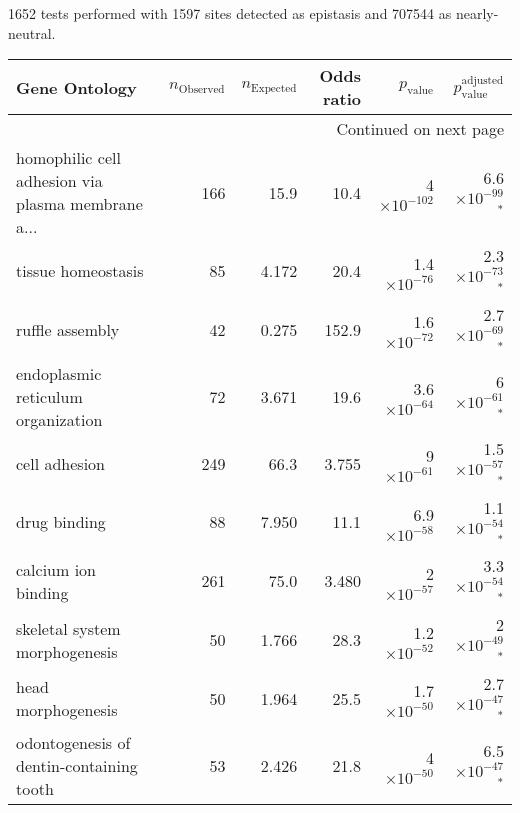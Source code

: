1652 tests performed with 1597 sites detected as epistasis and 707544 as nearly-neutral.
\scriptsize
\begin{longtable}{|l|r|r|r|r|r|}
\toprule
                                     Gene Ontology & $n_{\mathrm{Observed}}$ & $n_{\mathrm{Expected}}$ & Odds ratio &     $p_{\mathrm{value}}$ &      $p_{\mathrm{value}}^{\mathrm{adjusted}}$ \\
\midrule
\endhead
\midrule
\multicolumn{6}{r}{{Continued on next page}} \\
\midrule
\endfoot

\bottomrule
\endlastfoot
 homophilic cell adhesion via plasma membrane a... &                     166 &                    15.9 &       10.4 &  4$\times 10^{-102}$ &  6.6$\times 10^{-99}$$\bm{^*}$ \\
                                tissue homeostasis &                      85 &                   4.172 &       20.4 & 1.4$\times 10^{-76}$ &  2.3$\times 10^{-73}$$\bm{^*}$ \\
                                   ruffle assembly &                      42 &                   0.275 &      152.9 & 1.6$\times 10^{-72}$ &  2.7$\times 10^{-69}$$\bm{^*}$ \\
                endoplasmic reticulum organization &                      72 &                   3.671 &       19.6 & 3.6$\times 10^{-64}$ &    6$\times 10^{-61}$$\bm{^*}$ \\
                                     cell adhesion &                     249 &                    66.3 &      3.755 &   9$\times 10^{-61}$ &  1.5$\times 10^{-57}$$\bm{^*}$ \\
                                      drug binding &                      88 &                   7.950 &       11.1 & 6.9$\times 10^{-58}$ &  1.1$\times 10^{-54}$$\bm{^*}$ \\
                               calcium ion binding &                     261 &                    75.0 &      3.480 &   2$\times 10^{-57}$ &  3.3$\times 10^{-54}$$\bm{^*}$ \\
                     skeletal system morphogenesis &                      50 &                   1.766 &       28.3 & 1.2$\times 10^{-52}$ &    2$\times 10^{-49}$$\bm{^*}$ \\
                                head morphogenesis &                      50 &                   1.964 &       25.5 & 1.7$\times 10^{-50}$ &  2.7$\times 10^{-47}$$\bm{^*}$ \\
          odontogenesis of dentin-containing tooth &                      53 &                   2.426 &       21.8 &   4$\times 10^{-50}$ &  6.5$\times 10^{-47}$$\bm{^*}$ \\

\end{longtable}
